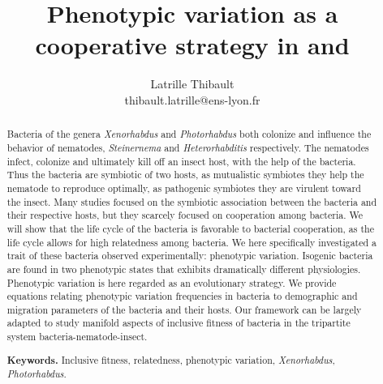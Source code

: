 \documentclass[10pt]{article}
\author{Latrille Thibault\\
\small thibault.latrille@ens-lyon.fr\\[-0.8ex]}
\title{Phenotypic variation as a cooperative strategy in \Xeno and \Photo}
\newcommand{\Xeno}{\textit{Xenorhabdus} }
\newcommand{\Stein}{\textit{Steinernema} }
\newcommand{\Photo}{\textit{Photorhabdus} }
\newcommand{\Hetero}{\textit{Heterorhabditis} }
\begin{document}

\begin{abstract}
Bacteria of the genera \Xeno and \Photo both colonize and influence the behavior of nematodes, \Stein and \Hetero respectively.
The nematodes infect, colonize and ultimately kill off an insect host, with the help of the bacteria.
Thus the bacteria are symbiotic of two hosts, as mutualistic symbiotes they help the nematode to reproduce optimally, as pathogenic symbiotes they are virulent toward the insect.
Many studies focused on the symbiotic association between the bacteria and their respective hosts, but they scarcely focused on cooperation among bacteria.
We will show that the life cycle of the bacteria is favorable to bacterial cooperation, as the life cycle allows for high relatedness among bacteria.
We here specifically investigated a trait of these bacteria observed experimentally: phenotypic variation. 
Isogenic bacteria are found in two phenotypic states that exhibits dramatically different physiologies. 
Phenotypic variation is here regarded as an evolutionary strategy.
We provide equations relating phenotypic variation frequencies in bacteria to demographic and migration parameters of the bacteria and their hosts. 
Our framework can be largely adapted to study manifold aspects of inclusive fitness of bacteria in the tripartite system bacteria-nematode-insect.

\smallskip
\noindent \textbf{Keywords.} Inclusive fitness, relatedness, phenotypic variation, \textit{Xenorhabdus}, \textit{Photorhabdus}.
\end{abstract}
\end{document}
